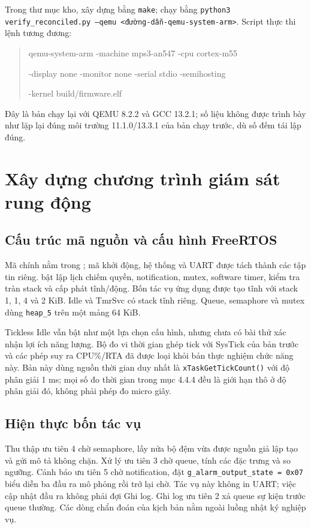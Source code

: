 \documentclass[12pt,a4paper,oneside]{report}
\begin{document}
Trong thư mục kho, xây dựng bằng \texttt{make}; chạy bằng \texttt{python3 verify\_reconciled.py --qemu <đường-dẫn-qemu-system-arm>}. Script thực thi lệnh tương đương:
\begin{quote}\small\ttfamily
qemu-system-arm -machine mps3-an547 -cpu cortex-m55\par
-display none -monitor none -serial stdio -semihosting\par
-kernel build/firmware.elf
\end{quote}
Đây là bản chạy lại với QEMU 8.2.2 và GCC 13.2.1; số liệu không được trình bày như lặp lại đúng môi trường 11.1.0/13.3.1 của bản chạy trước, dù số đếm tái lập đúng.

\section{Xây dựng chương trình giám sát rung động}
\subsection{Cấu trúc mã nguồn và cấu hình FreeRTOS}
Mã chính nằm trong ; mã khởi động, hệ thống và UART được tách thành các tập tin riêng.  bật lập lịch chiếm quyền, notification, mutex, software timer, kiểm tra tràn stack và cấp phát tĩnh/động. Bốn tác vụ ứng dụng được tạo tĩnh với stack 1, 1, 4 và 2 KiB. Idle và TmrSvc có stack tĩnh riêng. Queue, semaphore và mutex dùng \texttt{heap\_5} trên một mảng 64 KiB.

Tickless Idle vẫn bật như một lựa chọn cấu hình, nhưng chưa có bài thử xác nhận lợi ích năng lượng. Bộ đo vi thời gian ghép tick với SysTick của bản trước và các phép suy ra CPU\%/RTA đã được loại khỏi bản thực nghiệm chức năng này. Bản này dùng nguồn thời gian duy nhất là \texttt{xTaskGetTickCount()} với độ phân giải 1 ms; mọi số đo thời gian trong mục 4.4.4 đều là giới hạn thô ở độ phân giải đó, không phải phép đo micro giây.

\subsection{Hiện thực bốn tác vụ}
Thu thập ưu tiên 4 chờ semaphore, lấy nửa bộ đệm vừa được nguồn giả lập tạo và gửi mô tả không chặn. Xử lý ưu tiên 3 chờ queue, tính các đặc trưng và so ngưỡng. Cảnh báo ưu tiên 5 chờ notification, đặt \texttt{g\_alarm\_output\_state = 0x07} biểu diễn ba đầu ra mô phỏng rồi trở lại chờ. Tác vụ này không in UART; việc cập nhật đầu ra không phải đợi Ghi log. Ghi log ưu tiên 2 xả queue sự kiện trước queue thường. Các dòng chẩn đoán của kịch bản nằm ngoài luồng nhật ký nghiệp vụ.
\end{document}
